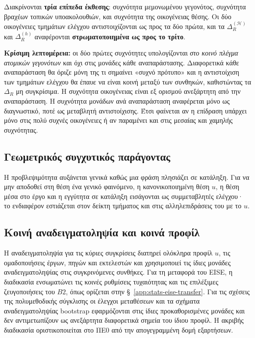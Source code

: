 \documentclass[11pt,a4paper]{article}
\begin{document}
Διακρίνονται \textbf{τρία επίπεδα έκθεσης}: συχνότητα μεμονωμένου γεγονότος, συχνότητα βραχέων τοπικών υποακολουθιών, και συχνότητα της οικογένειας θέσης. Οι δύο οικογένειες τμημάτων ελέγχου αντιστοιχίζονται ως προς τα δύο πρώτα, και τα \(\Delta_R^{(\mathcal H)}\) και \(\Delta_R^{(h)}\) αναφέρονται \textbf{στρωματοποιημένα ως προς το τρίτο}.

\textbf{Κρίσιμη λεπτομέρεια:} οι δύο πρώτες συχνότητες υπολογίζονται \emph{στο κοινό πλέγμα ατομικών γεγονότων} και όχι στις μονάδες κάθε αναπαράστασης. Διαφορετικά κάθε αναπαράσταση θα όριζε μόνη της τι σημαίνει «συχνό πρότυπο» και η αντιστοίχιση των τμημάτων ελέγχου θα έπαυε να είναι κοινή μεταξύ των συνθηκών, καθιστώντας τα \(\Delta_R\) μη συγκρίσιμα. Η συχνότητα οικογένειας είναι εξ ορισμού ανεξάρτητη από την αναπαράσταση. Η συχνότητα μονάδων ανά αναπαράσταση αναφέρεται μόνο ως διαγνωστικό, ποτέ ως μεταβλητή αντιστοίχισης. Έτσι φαίνεται αν η επίδραση υπάρχει μόνο στις πολύ συχνές οικογένειες ή αν παραμένει και στις μεσαίας και χαμηλής συχνότητας.

\subsection{Γεωμετρικός συγχυτικός παράγοντας}\label{app:match-geometry}

Η προβλεψιμότητα αυξάνεται γενικά καθώς μια φράση πλησιάζει σε κατάληξη. Για να μην αποδοθεί στη θέση ένα γενικό φαινόμενο, η κανονικοποιημένη θέση \(u\), η θέση μέσα στο έργο και η εγγύτητα σε κατάληξη εισάγονται ως συμμεταβλητές ελέγχου· το ενδιαφέρον εστιάζεται στον δείκτη τμήματος και στις αλληλεπιδράσεις του με το \(u\).



\subsection{Κοινή αναδειγματοληψία και κοινά προφίλ}\label{app:match-resampling}

Η αναδειγματοληψία για τις κύριες συγκρίσεις διατηρεί ολόκληρα προφίλ \(u\), τις ομαδοποιήσεις έργων, πηγών και εκτελεστών και χρησιμοποιεί τις ίδιες μονάδες αναδειγματοληψίας στις συγκρινόμενες συνθήκες. Για τη μεταφορά του EISE, η διαδικασία ενσωματώνει τις κοινές ρυθμίσεις τυχαιότητας και τις επιλέξιμες ζευγοποιήσεις του \(B2\), όπως ορίζεται στην §~\ref{app:stats-eise-transfer}. Για τις σχέσεις της πολυμεθοδικής σύγκλισης οι έλεγχοι μεταθέσεων και τα σχήματα αναδειγματοληψίας bootstrap εφαρμόζονται στις ίδιες προκαθορισμένες μονάδες και δεν αντιμετωπίζουν ως ανεξάρτητα διαφορετικά σημεία του ίδιου προφίλ. Η ακριβής διαδικασία οριστικοποιείται στο ΠΕ0 από την απογεγραμμένη δομή εξαρτήσεων.
\end{document}
